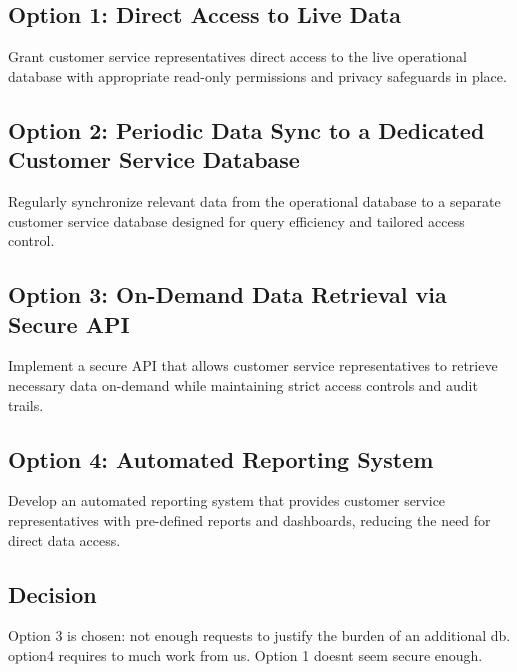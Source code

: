 \subsection*{Option 1: Direct Access to Live Data}
Grant customer service representatives direct access to the live operational database with appropriate read-only permissions and privacy safeguards in place.

\subsection*{Option 2: Periodic Data Sync to a Dedicated Customer Service Database}
Regularly synchronize relevant data from the operational database to a separate customer service database designed for query efficiency and tailored access control.

\subsection*{Option 3: On-Demand Data Retrieval via Secure API}
Implement a secure API that allows customer service representatives to retrieve necessary data on-demand while maintaining strict access controls and audit trails.

\subsection*{Option 4: Automated Reporting System}
Develop an automated reporting system that provides customer service representatives with pre-defined reports and dashboards, reducing the need for direct data access.

\subsection*{Decision}
Option 3 is chosen: not enough requests to justify the burden of an additional db. option4 requires to much work from us. Option 1 doesnt seem secure enough.

